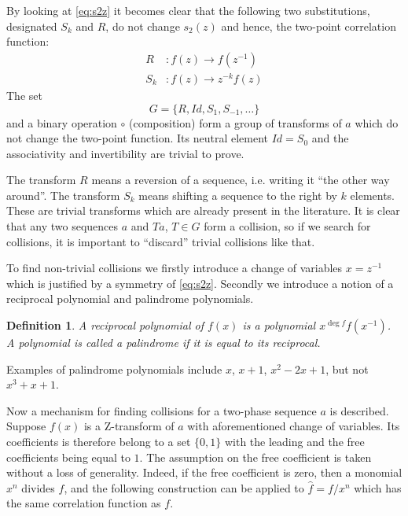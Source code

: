 \documentclass[12pt, a4paper]{article}
\newtheorem{definition}{Definition}
\begin{document}
By looking at \cref{eq:s2z} it becomes clear that the following two
substitutions, designated $S_k$ and $R$, do not change $s_2(z)$ and hence, the
two-point correlation function:
\begin{equation}
  \begin{aligned}
    R&: f(z) \rightarrow f(z^{-1}) \\
    S_k&: f(z) \rightarrow z^{-k}f(z)
  \end{aligned}
  \label{eq:group-elts}
\end{equation}
The set
\begin{equation}
  G = \{R, Id, S_1, S_{-1}, \dots \}
  \label{eq:group}
\end{equation}
and a binary operation $\circ$ (composition) form a group of transforms of $a$
which do not change the two-point function. Its neutral element $Id = S_0$ and
the associativity and invertibility are trivial to prove.

The transform $R$ means a reversion of a sequence, i.e. writing it ``the other
way around''. The transform $S_k$ means shifting a sequence to the right by $k$
elements. These are trivial transforms which are already present in the
literature. It is clear that any two sequences $a$ and $Ta$, $T \in G$ form a
collision, so if we search for collisions, it is important to ``discard''
trivial collisions like that.

To find non-trivial collisions we firstly introduce a change of variables
$x = z^{-1}$ which is justified by a symmetry of \cref{eq:s2z}. Secondly we
introduce a notion of a reciprocal polynomial and palindrome polynomials.
\begin{definition}
  A reciprocal polynomial of $f(x)$ is a polynomial $x^{\deg f}f(x^{-1})$. A
  polynomial is called a palindrome if it is equal to its reciprocal.
\end{definition}
Examples of palindrome polynomials include $x$, $x + 1$, $x^2 - 2x + 1$, but not
$x^3+x+1$.

Now a mechanism for finding collisions for a two-phase sequence $a$ is
described. Suppose $f(x)$ is a Z-transform of $a$ with aforementioned change of
variables. Its coefficients is therefore belong to a set $\{0, 1\}$ with the
leading and the free coefficients being equal to $1$. The assumption on the free
coefficient is taken without a loss of generality. Indeed, if the free
coefficient is zero, then a monomial $x^n$ divides $f$, and the following
construction can be applied to $\hat{f} = f / x^n$ which has the same
correlation function as $f$.
\end{document}
